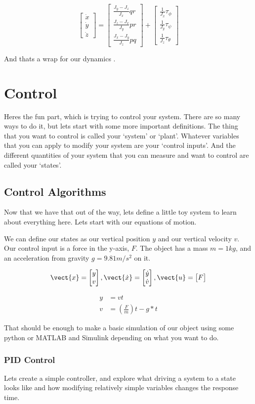 \documentclass{report}
\newcommand{\cvec}[1]{\begin{bmatrix}
    #1
\end{bmatrix}}
\begin{document}
\begin{equation}
    \cvec{\dot x \\ \dot y \\ \dot z} = 
    \cvec{ \frac{J_y - J_z}{J_x}qr 
        \\ \frac{J_z - J_x}{J_y}pr 
        \\ \frac{J_x - J_y}{J_z}pq}
    + \cvec{ \frac{1}{J_x} \tau_{\phi} \\ 
             \frac{1}{J_y} \tau_{\psi} \\ 
             \frac{1}{J_z} \tau_{\theta}}
\end{equation}

And thats a wrap for our dynamics \dSmiley.

\chapter{Control}
Heres the fun part, which is trying to control your system. There are so many ways to do it, but lets start with some more important definitions. The thing that you want to control is called your `system' or `plant'. Whatever variables that you can apply to modify your system are your `control inputs'. And the different quantities of your system that you can measure and want to control are called your `states'.

\section{Control Algorithms}
Now that we have that out of the way, lets define a little toy system to learn about everything here. Lets start with our equations of motion.

We can define our states as our vertical position $y$ and our vertical velocity $v$. Our control input is a force in the y{-}axis, $F$. The object has a mass $m = 1kg$, and an acceleration from gravity $g = 9.81 m/s^2$ on it. 

\begin{equation}
    \vect{x} = \cvec{y \\ v},
    \vect{\dot x} = \cvec {\dot y \\ \dot v},
    \vect{u} = \cvec{F}
\end{equation}

\begin{equation} \label{simple_eom}
    \begin{split}
        y & = vt \\
        v & = \left( \frac{F}{m} \right) t - g * t    
    \end{split}
\end{equation} 

That should be enough to make a basic simulation of our object using some python or MATLAB and Simulink depending on what you want to do. 

\subsection{PID Control}
Lets create a simple controller, and explore what driving a system to a state looks like and how modifying relatively simple variables changes the response time.
\end{document}
